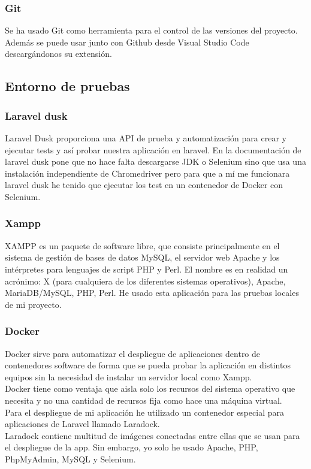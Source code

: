 \subsubsection{Git}
Se ha usado Git como herramienta para el control de las versiones del proyecto. Además se puede usar junto con Github desde Visual Studio Code descargándonos su extensión.

\subsection{Entorno de pruebas}

\subsubsection{Laravel dusk}
Laravel Dusk proporciona una API de prueba y automatización para crear y ejecutar tests y así probar nuestra aplicación en laravel.
En la documentación de laravel dusk pone que no hace falta descargarse JDK o Selenium sino que usa una instalación independiente de Chromedriver pero para que a mí me funcionara laravel dusk he tenido que ejecutar los test en un contenedor de Docker con Selenium.\cite{LaravelDusk}

\subsubsection{Xampp}
XAMPP es un paquete de software libre, que consiste principalmente en el sistema de gestión de bases de datos MySQL, el servidor web Apache y los intérpretes para lenguajes de script PHP y Perl. El nombre es en realidad un acrónimo: X (para cualquiera de los diferentes sistemas operativos), Apache, MariaDB/MySQL, PHP, Perl.\cite{Xampp}
He usado esta aplicación para las pruebas locales de mi proyecto.
\subsubsection{Docker}
Docker sirve para automatizar el despliegue de aplicaciones dentro de contenedores software de forma que se pueda probar la aplicación en distintos equipos sin la necesidad de instalar un servidor local como Xampp.\\ \cite{Docker}
Docker tiene como ventaja que aisla solo los recursos del sistema operativo que necesita y no una cantidad de recursos fija como hace una máquina virtual.\\
Para el despliegue de mi aplicación he utilizado un contenedor especial para aplicaciones de Laravel llamado Laradock.\\
Laradock contiene multitud de imágenes conectadas entre ellas que se usan para el despliegue de la app. Sin embargo, yo solo he usado Apache, PHP, PhpMyAdmin, MySQL y Selenium.\\
